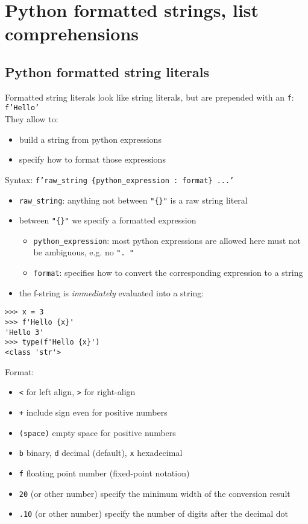 \documentclass[12pt]{article}
\begin{document}
\newpage
\section{Python formatted strings, list comprehensions}

\subsection{Python formatted string literals}

Formatted string literals look like string literals, but are prepended with an \texttt{f}:\\

\texttt{f'Hello'}\\

They allow  to:
\begin{itemize}
    \item build a string from python expressions
    \item specify how to format those expressions
\end{itemize}

Syntax:
\texttt{f'raw\_string \{python\_expression : format\} ...'}

\begin{itemize}
    \item \texttt{raw\_string}: anything not between \texttt{"\{\}"} is a raw string literal
    \item between \texttt{"\{\}"} we specify a formatted expression
    \begin{itemize}
        \item \texttt{python\_expression}: most python expressions are allowed here must not be ambiguous, e.g. no \texttt{". "}
        \item \texttt{format}: specifies how to convert the corresponding expression to a string
    \end{itemize}
    \item the f-string is \textit{immediately} evaluated into a string:
\end{itemize}

\begin{verbatim}
>>> x = 3
>>> f'Hello {x}'
'Hello 3'
>>> type(f'Hello {x}')
<class 'str'>
\end{verbatim}

Format:
\begin{itemize}
    \item \texttt{<} for left align, \texttt{>} for right-align
    \item \texttt{+} include sign even for positive numbers
    \item \texttt{(space)} empty space for positive numbers
    \item \texttt{b} binary, \texttt{d} decimal (default), \texttt{x} hexadecimal
    \item \texttt{f} floating point number (fixed-point notation)
    \item \texttt{20} (or other number) specify the minimum width of the conversion result
    \item \texttt{.10} (or other number) specify the number of digits after the decimal dot
\end{itemize}
\end{document}
